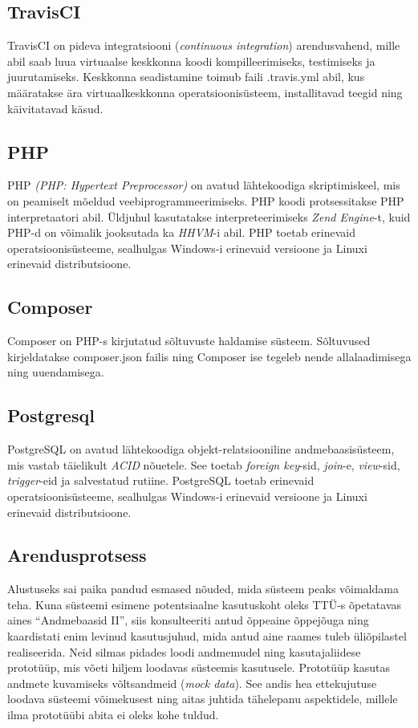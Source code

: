 \documentclass[a4paper,12pt]{article} %
\begin{document}
\subsection{TravisCI}
TravisCI on pideva integratsiooni (\textit{continuous integration}) arendusvahend, mille abil saab luua virtuaalse keskkonna koodi kompilleerimiseks, testimiseks ja juurutamiseks. Keskkonna seadistamine toimub faili .travis.yml abil, kus määratakse ära virtuaalkeskkonna operatsioonisüsteem, installitavad teegid ning käivitatavad käsud. \cite{TravisCI}
\subsection{PHP}
PHP \textit{(PHP: Hypertext Preprocessor)} on avatud lähtekoodiga skriptimiskeel, mis on peamiselt mõeldud veebiprogrammeerimiseks. \cite{What_Is_PHP} PHP koodi protsessitakse PHP interpretaatori abil. Üldjuhul kasutatakse interpreteerimiseks \textit{Zend Engine}-t, kuid PHP-d on võimalik jooksutada ka \textit{HHVM}-i \cite{HHVM} abil. PHP toetab erinevaid operatsioonisüsteeme, sealhulgas Windows-i erinevaid versioone ja Linuxi erinevaid distributsioone.
\subsection{Composer}
Composer on PHP-s kirjutatud sõltuvuste haldamise süsteem. Sõltuvused kirjeldatakse composer.json failis ning Composer ise tegeleb nende allalaadimisega ning uuendamisega. \cite{Composer}
\subsection{Postgresql}
PostgreSQL on avatud lähtekoodiga objekt-relatsiooniline andmebaasisüsteem, mis vastab täielikult \textit{ACID} nõuetele. See toetab \textit{foreign key}-sid, \textit{join}-e, \textit{view}-sid, \textit{trigger}-eid ja salvestatud rutiine. PostgreSQL toetab erinevaid operatsioonisüsteeme, sealhulgas Windows-i erinevaid versioone ja Linuxi erinevaid distributsioone.
\cite{PostgreSQL_About}
\subsection{Arendusprotsess}
Alustuseks sai paika pandud esmased nõuded, mida süsteem peaks võimaldama teha. Kuna süsteemi esimene potentsiaalne kasutuskoht oleks TTÜ-s õpetatavas aines ``Andmebaasid II'', siis konsulteeriti antud õppeaine õppejõuga ning kaardistati enim levinud kasutusjuhud, mida antud aine raames tuleb üliõpilastel realiseerida. Neid silmas pidades loodi andmemudel ning kasutajaliidese prototüüp, mis võeti hiljem loodavas süsteemis kasutusele. Prototüüp kasutas andmete kuvamiseks võltsandmeid (\textit{mock data}). See andis hea ettekujutuse loodava süsteemi võimekusest ning aitas juhtida tähelepanu aspektidele, millele ilma prototüübi abita ei oleks kohe tuldud.\par
\end{document}
